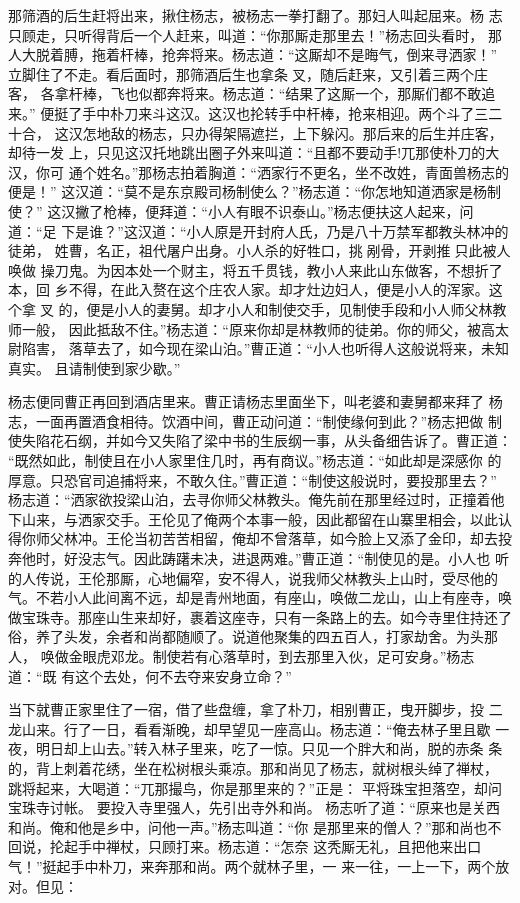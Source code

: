 那筛酒的后生赶将出来，揪住杨志，被杨志一拳打翻了。那妇人叫起屈来。杨
志只顾走，只听得背后一个人赶来，叫道：“你那厮走那里去！”杨志回头看时，
那人大脱着膊，拖着杆棒，抢奔将来。杨志道：“这厮却不是晦气，倒来寻洒家！”
立脚住了不走。看后面时，那筛酒后生也拿条叉，随后赶来，又引着三两个庄客，
各拿杆棒，飞也似都奔将来。杨志道：“结果了这厮一个，那厮们都不敢追来。”
便挺了手中朴刀来斗这汉。这汉也抡转手中杆棒，抢来相迎。两个斗了三二十合，
这汉怎地敌的杨志，只办得架隔遮拦，上下躲闪。那后来的后生并庄客，却待一发
上，只见这汉托地跳出圈子外来叫道：“且都不要动手!兀那使朴刀的大汉，你可
通个姓名。”那杨志拍着胸道：“洒家行不更名，坐不改姓，青面兽杨志的便是！”
这汉道：“莫不是东京殿司杨制使么？”杨志道：“你怎地知道洒家是杨制使？”
这汉撇了枪棒，便拜道：“小人有眼不识泰山。”杨志便扶这人起来，问道：“足
下是谁？”这汉道：“小人原是开封府人氏，乃是八十万禁军都教头林冲的徒弟，
姓曹，名正，祖代屠户出身。小人杀的好牲口，挑剐骨，开剥推只此被人唤做
操刀鬼。为因本处一个财主，将五千贯钱，教小人来此山东做客，不想折了本，回
乡不得，在此入赘在这个庄农人家。却才灶边妇人，便是小人的浑家。这个拿叉
的，便是小人的妻舅。却才小人和制使交手，见制使手段和小人师父林教师一般，
因此抵敌不住。”杨志道：“原来你却是林教师的徒弟。你的师父，被高太尉陷害，
落草去了，如今现在梁山泊。”曹正道：“小人也听得人这般说将来，未知真实。
且请制使到家少歇。”

杨志便同曹正再回到酒店里来。曹正请杨志里面坐下，叫老婆和妻舅都来拜了
杨志，一面再置酒食相待。饮酒中间，曹正动问道：“制使缘何到此？”杨志把做
制使失陷花石纲，并如今又失陷了梁中书的生辰纲一事，从头备细告诉了。曹正道：
“既然如此，制使且在小人家里住几时，再有商议。”杨志道：“如此却是深感你
的厚意。只恐官司追捕将来，不敢久住。”曹正道：“制使这般说时，要投那里去？”
杨志道：“洒家欲投梁山泊，去寻你师父林教头。俺先前在那里经过时，正撞着他
下山来，与洒家交手。王伦见了俺两个本事一般，因此都留在山寨里相会，以此认
得你师父林冲。王伦当初苦苦相留，俺却不曾落草，如今脸上又添了金印，却去投
奔他时，好没志气。因此踌躇未决，进退两难。”曹正道：“制使见的是。小人也
听的人传说，王伦那厮，心地偏窄，安不得人，说我师父林教头上山时，受尽他的
气。不若小人此间离不远，却是青州地面，有座山，唤做二龙山，山上有座寺，唤
做宝珠寺。那座山生来却好，裹着这座寺，只有一条路上的去。如今寺里住持还了
俗，养了头发，余者和尚都随顺了。说道他聚集的四五百人，打家劫舍。为头那人，
唤做金眼虎邓龙。制使若有心落草时，到去那里入伙，足可安身。”杨志道：“既
有这个去处，何不去夺来安身立命？”

当下就曹正家里住了一宿，借了些盘缠，拿了朴刀，相别曹正，曳开脚步，投
二龙山来。行了一日，看看渐晚，却早望见一座高山。杨志道：“俺去林子里且歇
一夜，明日却上山去。”转入林子里来，吃了一惊。只见一个胖大和尚，脱的赤条
条的，背上刺着花绣，坐在松树根头乘凉。那和尚见了杨志，就树根头绰了禅杖，
跳将起来，大喝道：“兀那撮鸟，你是那里来的？”正是：
平将珠宝担落空，却问宝珠寺讨帐。
要投入寺里强人，先引出寺外和尚。
杨志听了道：“原来也是关西和尚。俺和他是乡中，问他一声。”杨志叫道：“你
是那里来的僧人？”那和尚也不回说，抡起手中禅杖，只顾打来。杨志道：“怎奈
这秃厮无礼，且把他来出口气！”挺起手中朴刀，来奔那和尚。两个就林子里，一
来一往，一上一下，两个放对。但见：

